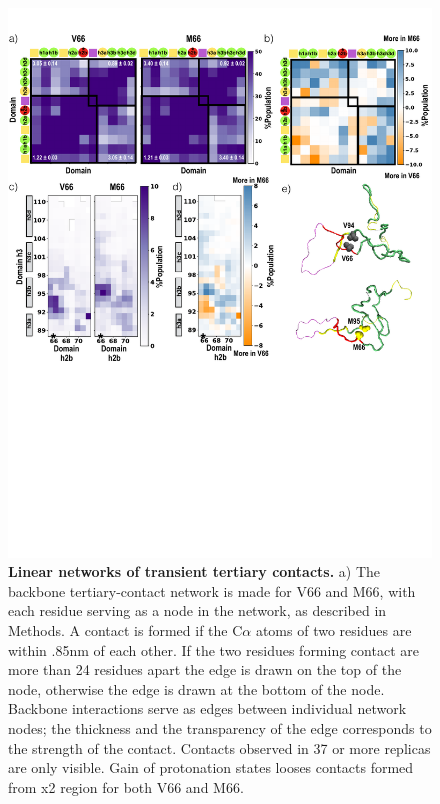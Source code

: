 \documentclass[10pt,letterpaper]{article}
\begin{document}
\begin{figure}[!ht]
\includegraphics[scale=0.5,width=12cm,trim={0 0cm 0 0cm},clip]{../figures/fig4.pdf}
\caption{{\bf Linear networks of transient tertiary contacts.} a) The backbone tertiary-contact network is made for V66 and M66, with each residue serving as a node in the network, as described in Methods. A contact is formed if the C$\alpha$ atoms of two residues are within .85nm of each other. If the two residues forming contact are more than 24 residues apart the edge is drawn on the top of the node, otherwise the edge is drawn at the bottom of the node. Backbone interactions serve as edges between individual network nodes; the thickness  and the transparency of the edge corresponds to the strength of the contact. Contacts observed in 37 or more replicas are only visible.  Gain of protonation states looses contacts formed from x2 region for both V66 and M66.
 }
\label{fig4}
\end{figure}
\end{document}
